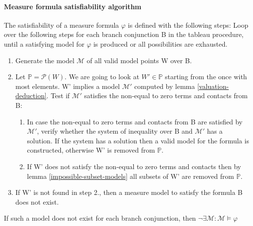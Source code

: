 \documentclass{article}
\newcommand{\vE}{\mathscr{v}}
\begin{document}
	\paragraph{Measure formula satisfiability algorithm} The satisfiability of a measure formula $\varphi$ is defined with the following steps:
\newline
\newline
	Loop over the following steps for each branch conjunction B in the tableau procedure, until a satisfying model for $\varphi$ is produced or all possibilities are exhausted.
	\begin{enumerate}
		\item Generate the model $\mathcal{M}$ of all valid model points W over B.
		\item Let $\mathbb{P} = \mathcal{P}(W)$. We are going to look at $W' \in \mathbb{P}$ starting from the once with most elements.
			W' implies a model $\mathcal{M'}$ computed by lemma \ref{valuation-deduction}.
			Test if $\mathcal{M'}$ satisfies the non-equal to zero terms and contacts from B:
		\begin{enumerate}
		\item In case the non-equal to zero terms and contacts from B are satisfied by $\mathcal{M'}$,
			verify whether the system of inequality over B and $\mathcal{M'}$ has a solution. 
			If the system has a solution then a valid model for the formula is constructed, otherwise W' is removed from $\mathbb{P}$.
		\item If W' does not satisfy the non-equal to zero terms and contacts  
			then by lemma \ref{impossible-subset-models} all subsets of W' are removed from $\mathbb{P}$.
		\end{enumerate}
		\item If W' is not found in step 2., then a measure model to satisfy the formula B does not exist.
	\end{enumerate}
	If such a model does not exist for each branch conjunction, then $\neg \exists \mathcal{M}: \mathcal{M} \models \varphi$ 
\end{document}
